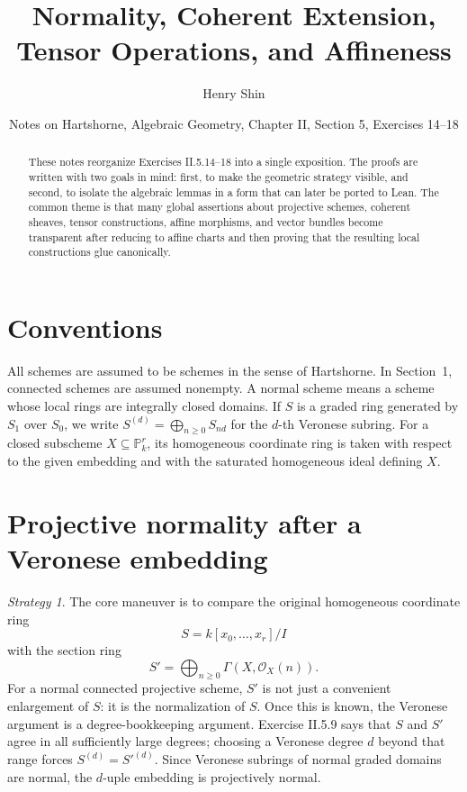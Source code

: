 \documentclass[11pt]{amsart}
\title{Normality, Coherent Extension, Tensor Operations, and Affineness}
\author{Henry Shin}
\date{Notes on Hartshorne, Algebraic Geometry, Chapter II, Section 5, Exercises 14--18}
\newcommand{\OO}{\mathcal O}
\theoremstyle{plain}
\theoremstyle{definition}
\theoremstyle{remark}
\newtheorem*{strategy}{Strategy}
\begin{document}
\begin{abstract}
These notes reorganize Exercises II.5.14--18 into a single exposition.  The proofs are written with two goals in mind: first, to make the geometric strategy visible, and second, to isolate the algebraic lemmas in a form that can later be ported to Lean.  The common theme is that many global assertions about projective schemes, coherent sheaves, tensor constructions, affine morphisms, and vector bundles become transparent after reducing to affine charts and then proving that the resulting local constructions glue canonically.
\end{abstract}
\maketitle

\section*{Conventions}
All schemes are assumed to be schemes in the sense of Hartshorne. In Section~1, connected schemes are assumed nonempty.  A normal scheme means a scheme whose local rings are integrally closed domains.  If $S$ is a graded ring generated by $S_1$ over $S_0$, we write $S^{(d)} = \bigoplus_{n\geq 0} S_{nd}$ for the $d$-th Veronese subring.  For a closed subscheme $X\subseteq \mathbb P^r_k$, its homogeneous coordinate ring is taken with respect to the given embedding and with the saturated homogeneous ideal defining $X$.

\section{Projective normality after a Veronese embedding}

\begin{strategy}
The core maneuver is to compare the original homogeneous coordinate ring
\[
  S = k[x_0,\ldots,x_r]/I
\]
with the section ring
\[
  S' = \bigoplus_{n\geq 0} \Gamma(X,\OO_X(n)).
\]
For a normal connected projective scheme, $S'$ is not just a convenient enlargement of $S$: it is the normalization of $S$.  Once this is known, the Veronese argument is a degree-bookkeeping argument.  Exercise II.5.9 says that $S$ and $S'$ agree in all sufficiently large degrees; choosing a Veronese degree $d$ beyond that range forces $S^{(d)} = S'^{(d)}$.  Since Veronese subrings of normal graded domains are normal, the $d$-uple embedding is projectively normal.
\end{strategy}
\end{document}
